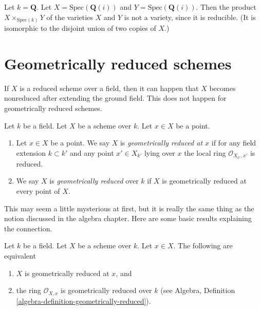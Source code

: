 \begin{example}
\label{example-product-not-a-variety}
Let $k = \mathbf{Q}$. Let $X = \text{Spec}(\mathbf{Q}(i))$
and $Y = \text{Spec}(\mathbf{Q}(i))$. Then the product
$X \times_{\text{Spec}(k)} Y$ of the varieties $X$ and $Y$
is not a variety, since it is reducible. (It is isomorphic
to the disjoint union of two copies of $X$.)
\end{example}







\section{Geometrically reduced schemes}
\label{section-geometrically-reduced}

\noindent
If $X$ is a reduced scheme over a field, then it can happen that $X$
becomes nonreduced after extending the ground field. This does not happen
for geometrically reduced schemes.

\begin{definition}
\label{definition-geometrically-reduced}
Let $k$ be a field.
Let $X$ be a scheme over $k$.
Let $x \in X$ be a point.
\begin{enumerate}
\item Let $x \in X$ be a point.
We say $X$ is {\it geometrically reduced at $x$}
if for any field extension $k \subset k'$
and any point $x' \in X_{k'}$ lying over $x$
the local ring $\mathcal{O}_{X_{k'}, x'}$ is reduced.
\item We say $X$ is {\it geometrically reduced} over $k$
if $X$ is geometrically reduced at every point of $X$.
\end{enumerate}
\end{definition}

\noindent
This may seem a little mysterious at first, but it is
really the same thing as the notion discussed in the algebra chapter.
Here are some basic results explaining the connection.

\begin{lemma}
\label{lemma-geometrically-reduced-at-point}
Let $k$ be a field.
Let $X$ be a scheme over $k$.
Let $x \in X$.
The following are equivalent
\begin{enumerate}
\item $X$ is geometrically reduced at $x$, and
\item the ring $\mathcal{O}_{X, x}$ is geometrically
reduced over $k$ (see
Algebra, Definition \ref{algebra-definition-geometrically-reduced}).
\end{enumerate}
\end{lemma}

